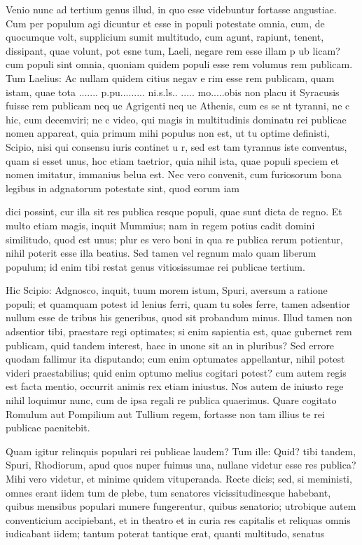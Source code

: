  Venio nunc ad tertium genus illud, in quo esse videbuntur fortasse angustiae. Cum per populum agi dicuntur et esse in populi potestate omnia, cum, de quocumque volt, supplicium sumit multitudo, cum agunt, rapiunt, tenent, dissipant, quae volunt, pot esne tum, Laeli, negare rem esse illam p ub licam? cum populi sint omnia, quoniam quidem populi esse rem volumus rem publicam. Tum Laelius: Ac nullam quidem citius negav e rim esse rem publicam, quam istam, quae tota ....... p.pu......... ni.s.ls.. ..... mo.....obis non placu it Syracusis fuisse rem publicam neq ue Agrigenti neq ue Athenis, cum es se nt tyranni, ne c hic, cum decemviri; ne c video, qui magis in multitudinis dominatu rei publicae nomen appareat, quia primum mihi populus non est, ut tu optime definisti, Scipio, nisi qui consensu iuris continet u r, sed est tam tyrannus iste conventus, quam si esset unus, hoc etiam taetrior, quia nihil ista, quae populi speciem et nomen imitatur, immanius belua est. Nec vero convenit, cum furiosorum bona legibus in adgnatorum potestate sint, quod eorum iam

 dici possint, cur illa sit res publica resque populi, quae sunt dicta de regno. Et multo etiam magis, inquit Mummius; nam in regem potius cadit domini similitudo, quod est unus; plur es vero boni in qua re publica rerum potientur, nihil poterit esse illa beatius. Sed tamen vel regnum malo quam liberum populum; id enim tibi restat genus vitiosissumae rei publicae tertium.

 Hic Scipio: Adgnosco, inquit, tuum morem istum, Spuri, aversum a ratione populi; et quamquam potest id lenius ferri, quam tu soles ferre, tamen adsentior nullum esse de tribus his generibus, quod sit probandum minus. Illud tamen non adsentior tibi, praestare regi optimates; si enim sapientia est, quae gubernet rem publicam, quid tandem interest, haec in unone sit an in pluribus? Sed errore quodam fallimur ita disputando; cum enim optumates appellantur, nihil potest videri praestabilius; quid enim optumo melius cogitari potest? cum autem regis est facta mentio, occurrit animis rex etiam iniustus. Nos autem de iniusto rege nihil loquimur nunc, cum de ipsa regali re publica quaerimus. Quare cogitato Romulum aut Pompilium aut Tullium regem, fortasse non tam illius te rei publicae paenitebit.

 Quam igitur relinquis populari rei publicae laudem? Tum ille: Quid? tibi tandem, Spuri, Rhodiorum, apud quos nuper fuimus una, nullane videtur esse res publica? Mihi vero videtur, et minime quidem vituperanda. Recte dicis; sed, si meministi, omnes erant iidem tum de plebe, tum senatores vicissitudinesque habebant, quibus mensibus populari munere fungerentur, quibus senatorio; utrobique autem conventicium accipiebant, et in theatro et in curia res capitalis et reliquas omnis iudicabant iidem; tantum poterat tantique erat, quanti multitudo, senatus


